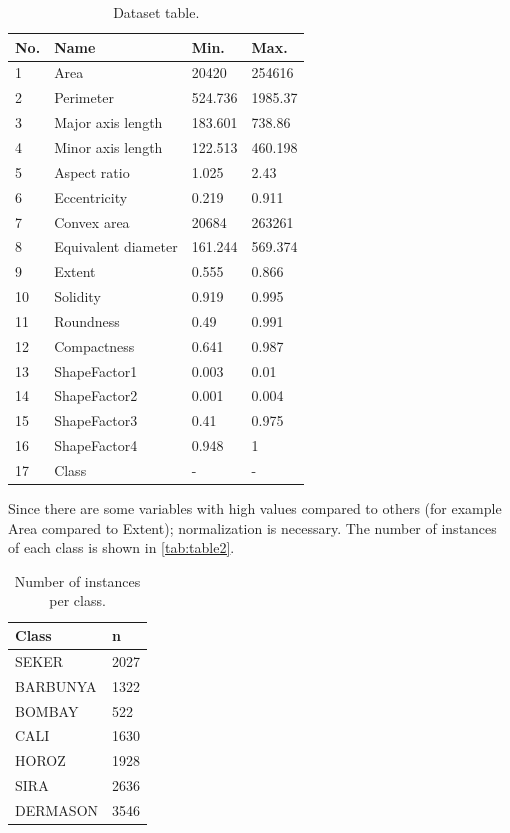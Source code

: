 \documentclass[a4paper,11pt]{article}
\begin{document}
\begin{table}[h]
\centering
\begin{tabular}{||l|l|l|l||}
	\hline
	No. & Name & Min. & Max.\\
	\hline
	1 & Area & 20420 & 254616\\
	2 & Perimeter & 524.736 & 1985.37\\
	3 & Major axis length & 183.601 & 738.86\\
	4 & Minor axis length & 122.513 & 460.198\\
	5 & Aspect ratio & 1.025 & 2.43\\
	6 & Eccentricity & 0.219 & 0.911\\
	7 & Convex area & 20684 & 263261\\
	8 & Equivalent diameter & 161.244 & 569.374\\
	9 & Extent & 0.555 & 0.866\\
	10 & Solidity & 0.919 & 0.995\\
	11 & Roundness & 0.49 & 0.991\\
	12 & Compactness & 0.641 & 0.987\\
	13 & ShapeFactor1 & 0.003 & 0.01\\
	14 & ShapeFactor2 & 0.001 & 0.004\\
	15 & ShapeFactor3 & 0.41 & 0.975\\
	16 & ShapeFactor4 & 0.948 & 1\\
	17 & Class & - & -\\
	\hline
\end{tabular}
\caption{Dataset table.}
\label{tab:table1}
\end{table}

Since there are some variables with high values compared to others (for example Area compared to Extent); normalization is necessary. The number of instances of each class is shown in \autoref{tab:table2}.

\begin{table}[h]
\centering
\begin{tabular}{||l|l||}
	\hline
	Class & n\\
	\hline
	SEKER & 2027\\
	BARBUNYA & 1322\\
	BOMBAY & 522\\
	CALI & 1630\\
	HOROZ & 1928\\
	SIRA & 2636\\
	DERMASON & 3546\\
	\hline
\end{tabular}
\caption{Number of instances per class.}
\label{tab:table2}
\end{table}
\end{document}
